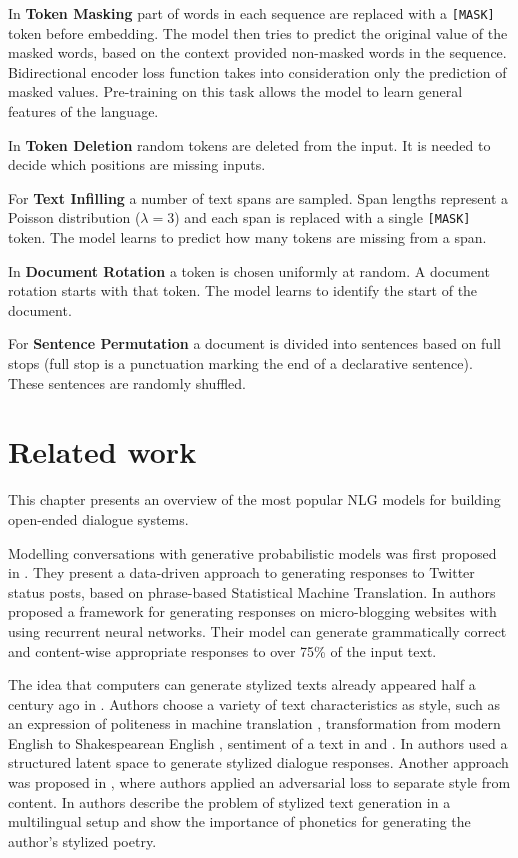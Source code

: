 In \textbf{Token Masking} part of words in each sequence are replaced with a \texttt{[MASK]} token before embedding. The model then tries to predict the original value of the masked words, based on the context provided non-masked words in the sequence. Bidirectional encoder loss function takes into consideration only the prediction of masked values. Pre-training on this task allows the model to learn general features of the language.

In \textbf{Token Deletion} random tokens are deleted from the input. It is needed to decide which positions are missing inputs.

For \textbf{Text Infilling} a number of text spans are sampled. Span lengths represent a Poisson distribution ($\lambda=3$) and each span is replaced with a single \texttt{[MASK]} token. The model learns to predict how many tokens are missing from a span.

In \textbf{Document Rotation} a token is chosen uniformly at random. A document rotation starts with that token. The model learns to identify the start of the document.

For \textbf{Sentence Permutation} a document is divided into sentences based on full stops (full stop is a punctuation marking the end of a declarative sentence). These sentences are randomly shuffled.

\chapter{Related work} \label{related_work}
This chapter presents an overview of the most popular NLG models for building open-ended dialogue systems. 

Modelling conversations with generative probabilistic models was first proposed in \cite{ritter2011data}. They present a data-driven approach to generating responses to Twitter status posts, based on phrase-based Statistical Machine Translation. In \cite{shang2015neural} authors proposed a framework for generating responses on micro-blogging websites with using recurrent neural networks. Their model can generate grammatically correct and content-wise appropriate responses to over 75\% of the input text. 

The idea that computers can generate stylized texts already appeared half a century ago in \cite{wheatley1965computer}. Authors choose a variety of text characteristics as style, such as an expression of politeness in machine translation \cite{sennrich2016controlling}, transformation from modern English to Shakespearean English \cite{jhamtani2017shakespearizing}, sentiment of a text in \cite{shen2017style} and \cite{li2018delete}. In \cite{gao2019structuring} authors used a structured latent space to generate stylized dialogue responses. Another approach was proposed in \cite{john2018disentangled}, where authors applied an adversarial loss to separate style from content. In \cite{tikhonov2018guess} authors describe the problem of stylized text generation in a multilingual setup and show the importance of phonetics for generating the author's stylized poetry.

